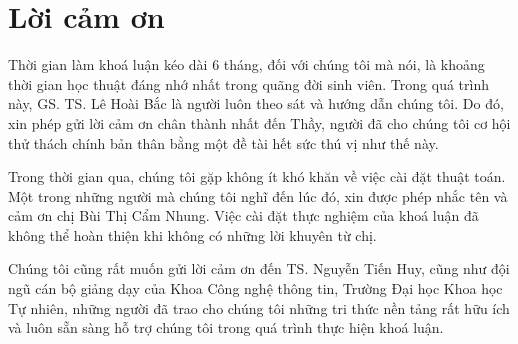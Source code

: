 \chapter*{Lời cảm ơn}
\label{thanks}

Thời gian làm khoá luận kéo dài 6 tháng, đối với chúng tôi mà nói, là khoảng thời gian học thuật đáng nhớ nhất trong quãng đời sinh viên. Trong quá trình này, GS. TS. Lê Hoài Bắc là người luôn theo sát và hướng dẫn chúng tôi. Do đó, xin phép gửi lời cảm ơn chân thành nhất đến Thầy, người đã cho chúng tôi cơ hội thử thách chính bản thân bằng một đề tài hết sức thú vị như thế này.

Trong thời gian qua, chúng tôi gặp không ít khó khăn về việc cài đặt thuật toán. Một trong những người mà chúng tôi nghĩ đến lúc đó, xin được phép nhắc tên và cảm ơn chị Bùi Thị Cẩm Nhung. Việc cài đặt thực nghiệm của khoá luận đã không thể hoàn thiện khi không có những lời khuyên từ chị.

Chúng tôi cũng rất muốn gửi lời cảm ơn đến TS. Nguyễn Tiến Huy, cũng như đội ngũ cán bộ giảng dạy của Khoa Công nghệ thông tin, Trường Đại học Khoa học Tự nhiên, những người đã trao cho chúng tôi những tri thức nền tảng rất hữu ích và luôn sẵn sàng hỗ trợ chúng tôi trong quá trình thực hiện khoá luận.
